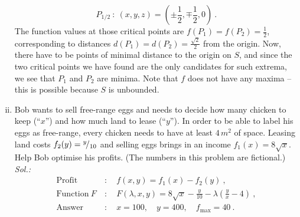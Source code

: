 \begin{example}
\begin{enumerate}[(i)]
	\[ P_{1/2} \: : \: (x,y,z) = \left( \pm\frac12, \mp\frac12,0 \right) \:. \]
	The function values at those critical points are $f(P_1)=f(P_2)=\tfrac12$, corresponding to distances $d(P_1)=d(P_2)=\tfrac{\sqrt{2}}{2}$ from the origin. Now, there have to be points of minimal distance to the origin on $S$, and since the two critical points we have found are the only candidates for such extrema, we see that $P_1$ and $P_2$ are minima. Note that $f$ does not have any maxima -- this is possible because $S$ is unbounded.
	\item Bob wants to sell free-range eggs and needs to decide how many chicken to keep (``$x$'') and how much land to lease (``$y$''). In order to be able to label his eggs as free-range, every chicken needs to have at least $4\,m^2$ of space. Leasing land costs $f_2(y)={}^{y}\!/_{10}$ and selling eggs brings in an income $f_1(x)=8\sqrt{x}$. Help Bob optimise his profits. (The numbers in this problem are fictional.)\\
	{\it Sol.:}
	\begin{equation*}
	\begin{split}
	 \mathrm{Profit}\: &: \quad f(x,y) = f_1(x) - f_2(y) \:, \\
	 \mathrm{Function~}F\: &: \quad
	 F(\lambda,x,y) = 8\sqrt{x} - \frac{y}{10} - \lambda \left( \frac{y}{x}-4 \right) \:, \\
	 \mathrm{Answer}\: &: \quad x=100, \quad y=400, \quad f_{\text{max}} = 40 \:.
	\end{split}
	\end{equation*}
\end{enumerate}	
\end{example}

